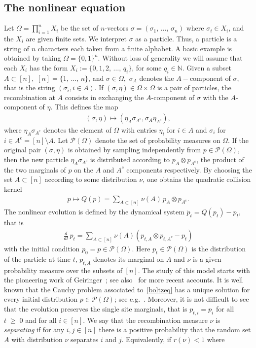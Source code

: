 \documentclass[10pt,a4paper]{article}
\renewcommand{\geq}{\;\geqslant\;}
\newcommand{\si}{\sigma}
\newcommand{\cP}{\mathcal{P}}
\newcommand{\bbN}{\mathbb{N}}
\let\O=\Omega
\begin{document}
\subsection{The nonlinear equation}\label{setup}
Let $\Omega = \prod_{i=1}^nX_i$ be the set of $n$-vectors $\sigma = (\sigma_1,\,\dots,\,\sigma_n)$ where $\si_i\in X_i$, and the $X_i$ are given finite sets. We interpret $\si$ as a particle. Thus, a particle is a string of $n$ characters each taken from a finite alphabet. A basic example is obtained by taking $\Omega=\{0,1\}^n$. Without loss of generality we will assume that each $X_i$ has the form $X_i :=\{0,1,2,\,\dots,\,q_i\}$, for some $q_i \in \bbN$. Given a subset $A \subset [n],$ $[n]=\{1,\,\dots,\,n\}$, and $\sigma \in \Omega,$ $\sigma_A$ denotes the $A-$component of $\sigma,$ that is the string $(\sigma_i, i \in A).$ If $(\sigma, \eta) \in \Omega \times \Omega$ is a pair of particles, the recombination at $A$ consists in exchanging the $A$-component of $\sigma$ with the $A$-component of $\eta.$ This defines the map
\begin{align*}
(\sigma,\eta) \mapsto (\eta_A\sigma_{A^c},\sigma_A\eta_{A^c}),
\end{align*}
where $\eta_A\sigma_{A^c}$ denotes the element of $\Omega$ with entries $\eta_i$ for $i \in A$ and $\sigma_i$ for $i \in A^c=[n]\setminus A.$ Let $\cP(\O)$ denote the set of probability measures on $\O$. If the original pair $(\si,\eta)$ is obtained by sampling independently from $p\in\cP(\O)$, then the new particle $\eta_A\si_{A^c}$ is distributed according to $p_A\otimes p_{A^c}$, the product of the two marginals of $p$ on the $A$ and $A^c$ components respectively. By choosing the set $A\subset[n]$ according to some distribution $\nu$, one obtains the quadratic collision kernel
\begin{align*}
p\mapsto Q(p) = \sum_{A \subset [n]}\nu(A)\,p_{A}\otimes p_{A^c}.
\end{align*}
The nonlinear evolution is defined by the dynamical system $\dot{p}_t = Q(p_t) - p_t$, that is
\begin{align}\label{boltzeq}
\frac{d}{dt}\,p_t = \sum_{A \subset [n]}\nu(A)\left(p_{t,A}\otimes p_{t,A^c} - p_t\right)
\end{align}
with the initial condition $p_0=p\in\cP(\O)$. Here $p_t\in\cP(\O)$ is the distribution of the particle at time $t$, $p_{t,A}$ denotes its marginal on $A$ and $\nu$ is a given probability measure over the subsets of $[n]$. The study of this model starts with the pioneering work of Geiringer~\cite{Gei}; see also~\cite{Martinez,Sinetal,Sinetal2,Baakeetal} for more recent accounts. It is well known that the Cauchy problem associated to~\eqref{boltzeq} has a unique solution for every initial distribution $p\in\cP(\O)$; see e.g.~\cite{Baakeetal}. Moreover, it is not difficult to see that the evolution preserves the single site marginals, that is $p_{t,i}=p_{i}$ for all $t\geq 0$ and for all $i\in[n]$. We say that the recombination measure $\nu$ is \emph{separating} if for any $i, j \in [n]$ there is a positive probability that the random set $A$ with distribution $\nu$ separates $i$ and $j$. Equivalently, if $r(\nu)<1$ where
\end{document}
